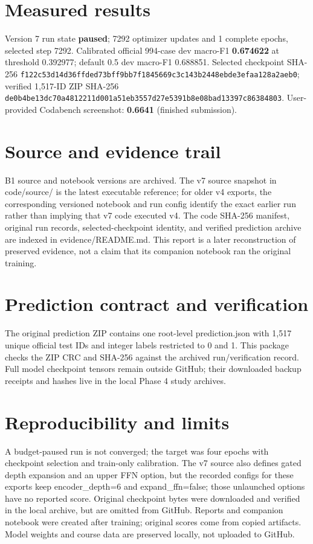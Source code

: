 \documentclass[11pt,a4paper]{article}
\begin{document}
\section{Measured results}
Version 7 run state \textbf{paused}; 7292 optimizer updates and 1 complete epochs, selected step 7292. Calibrated official 994-case dev macro-F1 \textbf{0.674622} at threshold 0.392977; default 0.5 dev macro-F1 0.688851. Selected checkpoint SHA-256 \texttt{f122c53d14d36ffded73bff9bb7f1845669c3c143b2448ebde3efaa128a2aeb0}; verified 1,517-ID ZIP SHA-256 \texttt{de0b4be13dc70a4812211d001a51eb3557d27e5391b8e08bad13397c86384803}. User-provided Codabench screenshot: \textbf{0.6641} (finished submission).
\section{Source and evidence trail}
B1 source and notebook versions are archived. The v7 source snapshot in code/source/ is the latest executable reference; for older v4 exports, the corresponding versioned notebook and run config identify the exact earlier run rather than implying that v7 code executed v4. The code SHA-256 manifest, original run records, selected-checkpoint identity, and verified prediction archive are indexed in evidence/README.md. This report is a later reconstruction of preserved evidence, not a claim that its companion notebook ran the original training.
\section{Prediction contract and verification}
The original prediction ZIP contains one root-level prediction.json with 1,517 unique official test IDs and integer labels restricted to 0 and 1. This package checks the ZIP CRC and SHA-256 against the archived run/verification record. Full model checkpoint tensors remain outside GitHub; their downloaded backup receipts and hashes live in the local Phase 4 study archives.
\section{Reproducibility and limits}
A budget-paused run is not converged; the target was four epochs with checkpoint selection and train-only calibration. The v7 source also defines gated depth expansion and an upper FFN option, but the recorded configs for these exports keep encoder\_depth=6 and expand\_ffn=false; those unlaunched options have no reported score. Original checkpoint bytes were downloaded and verified in the local archive, but are omitted from GitHub. Reports and companion notebook were created after training; original scores come from copied artifacts. Model weights and course data are preserved locally, not uploaded to GitHub.
\end{document}
